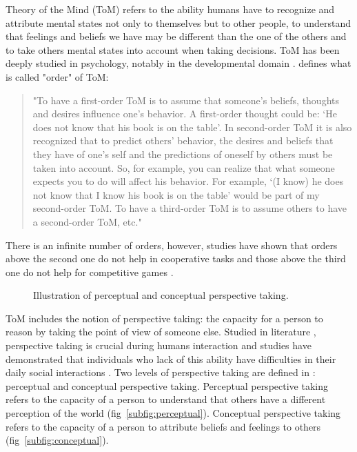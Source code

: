 \documentclass[english,a4paper,11pt,twoside]{StyleThese}
\begin{document}
Theory of the Mind (ToM) refers to the ability humans have to recognize and attribute mental states not only to themselves but to other people, to understand that feelings and beliefs we have may be different than the one of the others and to take others mental states into account when taking decisions. ToM has been deeply studied in psychology, notably in the developmental domain \cite{baron1985does, premack1978does}. \cite{verbrugge2008learning} defines what is called "order" of ToM:
\begin{quote}
"To have a first-order ToM is to assume that someone’s beliefs,
thoughts and desires influence one’s behavior. A first-order thought could be: ‘He does not know that his book is on the table’. In second-order ToM it is also recognized that to predict others’ behavior, the desires and beliefs that they have of one’s self and the predictions of oneself by others must be taken into account. So, for example, you can realize that what someone expects you to do will affect his behavior. For example, ‘(I know) he does not know that I know his book is on the table’ would be part of my second-order ToM. To have a third-order ToM is to assume others to have a second-order ToM, etc."
\end{quote}
There is an infinite number of orders, however, studies have shown that orders above the second one do not help in cooperative tasks \cite{de2014theory} and those above the third one do not help for competitive games \cite{de2014theory}.


\begin{figure}[!h]
    \centering
    \caption{Illustration of perceptual and conceptual perspective taking.}
\end{figure}

ToM includes the notion of perspective taking: the capacity for a person to reason by taking the point of view of someone else. Studied in literature \cite{tversky1999speakers, flavell1992perspectives}, perspective taking is crucial during humans interaction and studies have demonstrated that individuals who lack of this ability have difficulties in their daily social interactions \cite{frick2014picturing}. Two levels of perspective taking are defined in \cite{flavell1977development}: perceptual and conceptual perspective taking. Perceptual perspective taking refers to the capacity of a person to understand that others have a different perception of the world (fig~\ref{subfig:perceptual}). Conceptual perspective taking refers to the capacity of a person to attribute beliefs and feelings to others (fig~\ref{subfig:conceptual}).
\end{document}
